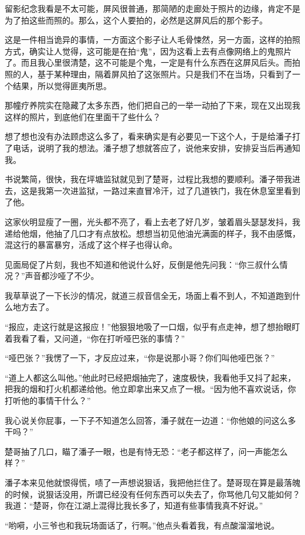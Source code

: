 留影纪念我看是不太可能，屏风很普通，那简陋的走廊处于照片的边缘，肯定不是为了拍这些而照的。那么，这个人要拍的，必然是这屏风后的那个影子。

这是一件相当诡异的事情，一方面这个影子让人毛骨悚然，另一方面，这样的拍照方式，确实让人觉得，这可能是在拍“鬼”，因为这看上去有点像网络上的鬼照片了。而且我心里很清楚，这不可能是个鬼，一定是有什么东西在这屏风后头。而拍照的人，基于某种理由，隔着屏风拍了这张照片。只是我们不在当场，只看到了一个结果，所以觉得匪夷所思。

那幢疗养院实在隐藏了太多东西，他们把自己的一举一动拍了下来，现在又出现我这样的照片，到底他们在里面干了些什么？

想了想也没有办法顾虑这么多了，看来确实是有必要见一下这个人，于是给潘子打了电话，说明了我的想法。潘子想了想就答应了，说他来安排，安排妥当后再通知我。

书说繁简，很快，我在坪塘监狱就见到了楚哥，过程比我想的要顺利。潘子带我进去，这是我第一次进监狱，一路过来直冒冷汗，过了几道铁门，我在休息室里看到了他。

这家伙明显瘦了一圈，光头都不亮了，看上去老了好几岁，皱着眉头瑟瑟发抖，我递给他烟，他抽了几口才有点放松。想想当初见他油光满面的样子，我不由感慨，混这行的暴富暴穷，活成了这个样子也得认命。

见面局促了片刻，我也不知道和他说什么好，反倒是他先问我：“你三叔什么情况？”声音都沙哑了不少。

我草草说了一下长沙的情况，就道三叔音信全无，场面上看不到人，不知道跑到什么地方去了。

“报应，走这行就是这报应！”他狠狠地吸了一口烟，似乎有点走神，想了想抬眼盯着我看了看，又问道，“你在打听哑巴张的事情？”

“哑巴张？”我愣了一下，才反应过来，“你是说那小哥？你们叫他哑巴张？”

“道上人都这么叫他。”他此时已经把烟抽完了，速度极快，我看他手又抖了起来，把我的烟和打火机都递给他。他立即拿出来又点了一根。“因为他不喜欢说话，你打听他的事情干什么？”

我心说关你屁事，一下子不知道怎么回答，潘子就在一边道：“你他娘的问这么多干吗？”

楚哥抽了几口，瞄了潘子一眼，也是有恃无恐：“老子都这样了，问一声能怎么样？”

潘子本来见他就恨得慌，啧了一声想说狠话，我把他拦住了。楚哥现在算是最落魄的时候，说狠话没用，所谓已经没有任何东西可以失去了，你骂他几句又能如何？我道：“楚哥，你在江湖上混得比我长多了，知道有些事情我真不好说。”

“哟嗬，小三爷也和我玩场面话了，行啊。”他点头看着我，有点酸溜溜地说。

